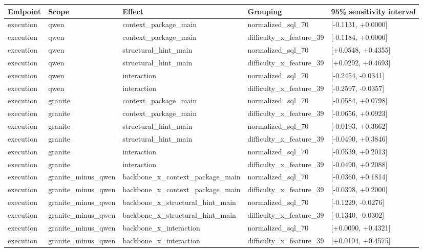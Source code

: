 \begin{tabular}{lllll}
\toprule
Endpoint & Scope & Effect & Grouping & 95\% sensitivity interval \\
\midrule
execution & qwen & context\_package\_main & normalized\_sql\_70 & [-0.1131, +0.0000] \\
execution & qwen & context\_package\_main & difficulty\_x\_feature\_39 & [-0.1184, +0.0000] \\
execution & qwen & structural\_hint\_main & normalized\_sql\_70 & [+0.0548, +0.4355] \\
execution & qwen & structural\_hint\_main & difficulty\_x\_feature\_39 & [+0.0292, +0.4693] \\
execution & qwen & interaction & normalized\_sql\_70 & [-0.2454, -0.0341] \\
execution & qwen & interaction & difficulty\_x\_feature\_39 & [-0.2597, -0.0357] \\
execution & granite & context\_package\_main & normalized\_sql\_70 & [-0.0584, +0.0798] \\
execution & granite & context\_package\_main & difficulty\_x\_feature\_39 & [-0.0656, +0.0923] \\
execution & granite & structural\_hint\_main & normalized\_sql\_70 & [-0.0193, +0.3662] \\
execution & granite & structural\_hint\_main & difficulty\_x\_feature\_39 & [-0.0490, +0.3846] \\
execution & granite & interaction & normalized\_sql\_70 & [-0.0539, +0.2013] \\
execution & granite & interaction & difficulty\_x\_feature\_39 & [-0.0490, +0.2088] \\
execution & granite\_minus\_qwen & backbone\_x\_context\_package\_main & normalized\_sql\_70 & [-0.0360, +0.1814] \\
execution & granite\_minus\_qwen & backbone\_x\_context\_package\_main & difficulty\_x\_feature\_39 & [-0.0398, +0.2000] \\
execution & granite\_minus\_qwen & backbone\_x\_structural\_hint\_main & normalized\_sql\_70 & [-0.1229, -0.0276] \\
execution & granite\_minus\_qwen & backbone\_x\_structural\_hint\_main & difficulty\_x\_feature\_39 & [-0.1340, -0.0302] \\
execution & granite\_minus\_qwen & backbone\_x\_interaction & normalized\_sql\_70 & [+0.0090, +0.4321] \\
execution & granite\_minus\_qwen & backbone\_x\_interaction & difficulty\_x\_feature\_39 & [+0.0104, +0.4575] \\

\end{tabular}
